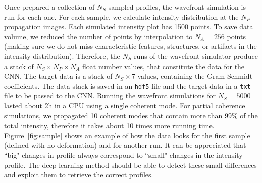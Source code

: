 \documentclass[preprint]{iucr}
\newcommand{\inred}[1]{{\color{red}#1}}
\begin{document}
Once prepared a collection of $N_S$ sampled profiles, the wavefront simulation is run for each one. For each sample,  we calculate intensity distribution at the $N_P$ propagation images. Each simulated intensity plot has 1500 points. To save data volume, we reduced the number of points by interpolation to $N_A=256$ points (making sure we do not miss characteristic features, structures, or artifacts in the intensity distribution). Therefore, the $N_S$ runs of the wavefront simulator produce a stack of $N_S \times N_P \times N_A$ float number values, that constitute the data for the CNN. The target data is a stack of $N_S \times 7$ values, containing the Gram-Schmidt coefficients. The data stack is saved in an \texttt{hdf5} file and the target data in a \texttt{txt} file to be passed to the CNN. Running the wavefront simulations for $N_S=5000$ lasted about 2h in a CPU using a single coherent mode. For partial coherence simulations, we propagated 10 coherent modes that contain more than 99\% of the total intensity, therefore it takes about 10 times more running time. Figure~\ref{fig:sample} shows an example of how the data looks for the first sample (defined with no deformation) and for another run. \inred{It can be appreciated that ``big" changes in profile always correspond to ``small" changes in the intensity profile. The deep learning method should be able to detect these small differences and exploit them to retrieve the correct profiles. }
\end{document}

